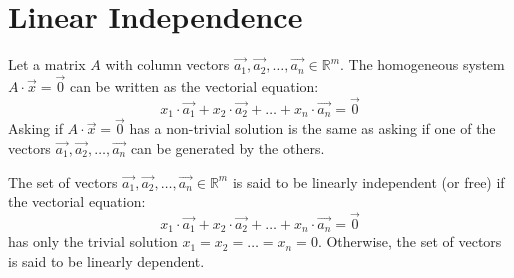 \section{Linear Independence}
Let a matrix $A$ with column vectors $\vec{a_1}, \vec{a_2}, \ldots, \vec{a_n} \in \mathbb{R}^m$. The homogeneous system $A \cdot \vec{x} = \vec{0}$ can be written as the vectorial equation:
\[
    x_1 \cdot \vec{a_1} + x_2 \cdot \vec{a_2} + \ldots + x_n \cdot \vec{a_n} = \vec{0}
\]
Asking if $A \cdot \vec{x} = \vec{0}$ has a non-trivial solution is the same as asking if one of the vectors $\vec{a_1}, \vec{a_2}, \ldots, \vec{a_n}$ can be generated by the others.
\begin{definition}
    The set of vectors $\vec{a_1}, \vec{a_2}, \ldots, \vec{a_n} \in \mathbb{R}^m$ is said to be linearly independent (or free) if the vectorial equation:
    \[
        x_1 \cdot \vec{a_1} + x_2 \cdot \vec{a_2} + \ldots + x_n \cdot \vec{a_n} = \vec{0}
    \]
    has only the trivial solution $x_1 = x_2 = \ldots = x_n = 0$. Otherwise, the set of vectors is said to be linearly dependent.
\end{definition}

